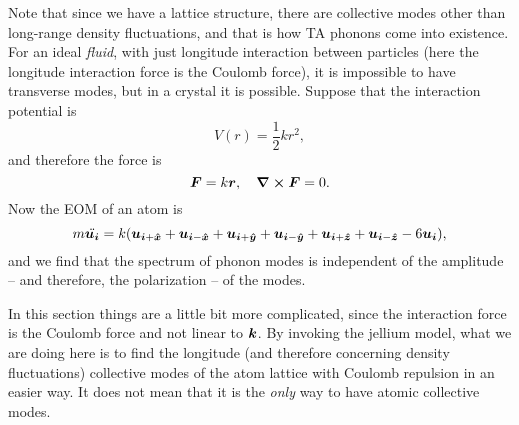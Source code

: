 \documentclass[hyperref, a4paper]{article}
\begin{document}
\begin{note*}{}
    Note that since we have a lattice structure, there are collective modes other than long-range density
    fluctuations, and that is how TA phonons come into existence. For an ideal \emph{fluid}, with just 
    longitude interaction between particles (here the longitude interaction force is the Coulomb force),
    it is impossible to have transverse modes, but in a crystal it is possible. Suppose that the interaction
    potential is 
    \[
        V(r) = \frac{1}{2} k r^2,
    \]
    and therefore the force is 
    \[
        \vb*{F} = k \vb*{r}, \quad \curl{\vb*{F}} = 0.
    \]
    Now the EOM of an atom is 
    \[
        m \ddot{\vb*{u}_{\vb*{i}}} = k (\vb*{u}_{\vb*{i} + \vu*{x}} + \vb*{u}_{\vb*{i} - \vu*{x}} + \vb*{u}_{\vb*{i} + \vu*{y}} + \vb*{u}_{\vb*{i} - \vu*{y}} + \vb*{u}_{\vb*{i} + \vu*{z}} + \vb*{u}_{\vb*{i} - \vu*{z}} - 6 \vb*{u}_{\vb*{i}}),
    \]
    and we find that the spectrum of phonon modes is independent of the amplitude -- and therefore, 
    the polarization -- of the modes. 

    In this section things are a little bit more complicated, since the interaction force is the Coulomb force 
    and not linear to $\vb*{k}$. By invoking the jellium model, what we are doing here is to find the longitude
    (and therefore concerning density fluctuations) collective modes of the atom lattice with Coulomb repulsion 
    in an easier way. It does not mean that it is the \emph{only} way to have atomic collective modes.
\end{note*}
\end{document}
